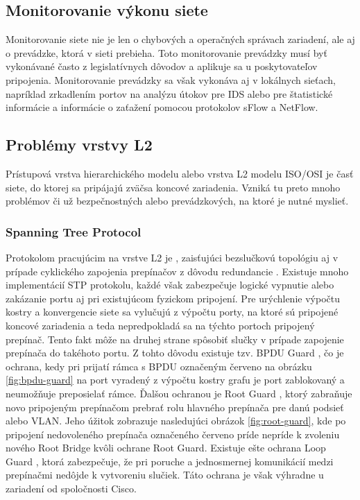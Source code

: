\subsection*{Monitorovanie výkonu siete}
Monitorovanie siete nie je len o chybových a operačných správach zariadení, ale aj o prevádzke, ktorá v sieti prebieha. Toto monitorovanie prevádzky musí byť vykonávané často z legislatívnych dôvodov a aplikuje sa u poskytovateľov pripojenia. Monitorovanie prevádzky sa však vykonáva aj v lokálnych sieťach, napríklad zrkadlením portov \cite{Singh2018} na analýzu útokov pre IDS alebo pre štatistické informácie a informácie o zaťažení pomocou protokolov sFlow a NetFlow.

\subsection*{Problémy vrstvy L2}
Prístupová vrstva hierarchického modelu alebo vrstva L2 modelu ISO/OSI je časť siete, do ktorej sa pripájajú zväčsa koncové zariadenia. Vzniká tu preto mnoho problémov či už bezpečnostných alebo prevádzkových, na ktoré je nutné myslieť.

\subsubsection*{Spanning Tree Protocol}
Protokolom pracujúcim na vrstve L2 je , zaisťujúci bezslučkovú topológiu aj v prípade cyklického zapojenia prepínačov z dôvodu redundancie \cite{Lammle2013}. Existuje mnoho implementácií STP protokolu, každé však zabezpečuje logické vypnutie alebo zakázanie portu aj pri existujúcom fyzickom pripojení. Pre urýchlenie výpočtu kostry a konvergencie siete sa vylučujú z výpočtu porty, na ktoré sú pripojené koncové zariadenia a teda nepredpokladá sa na týchto portoch pripojený prepínač. Tento fakt môže na druhej strane spôsobiť slučky v prípade zapojenie prepínača do takéhoto portu. Z tohto dôvodu existuje tzv. BPDU Guard \cite{Lammle2013}, čo je ochrana, kedy pri prijatí rámca s BPDU označeným červeno na obrázku  \ref{fig:bpdu-guard} na port vyradený z výpočtu kostry grafu je port zablokovaný a neumožňuje preposielať rámce. Ďalšou ochranou je Root Guard \cite{Vyncke2008}, ktorý zabraňuje novo pripojeným prepínačom prebrať rolu hlavného prepínača pre danú podsieť alebo VLAN. Jeho úžitok zobrazuje nasledujúci obrázok \ref{fig:root-guard}, kde po pripojení nedovoleného prepínača označeného červeno príde nepríde k zvoleniu nového Root Bridge kvôli ochrane Root Guard. Existuje ešte ochrana Loop Guard \cite{Vyncke2008}, ktorá zabezpečuje, že pri poruche a jednosmernej komunikácií medzi prepínačmi nedôjde k vytvoreniu slučiek. Táto ochrana je však výhradne u zariadení od spoločnosti Cisco. 

